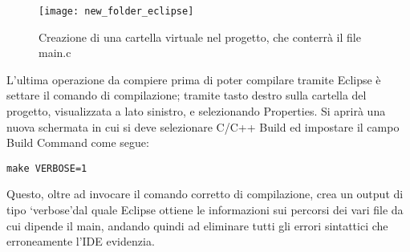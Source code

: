 \begin{figure}[H]
\texttt{[image: new\_folder\_eclipse]}
\centering
\caption{Creazione di una cartella virtuale nel progetto, che conterrà il file main.c}
\label{makefile_proj}
\end{figure}

L'ultima operazione da compiere prima di poter compilare tramite Eclipse è settare il comando di compilazione; tramite tasto destro sulla cartella del progetto, visualizzata a lato sinistro, e selezionando Properties. Si aprirà una nuova schermata in cui si deve selezionare C/C++ Build ed impostare il campo Build Command come segue: 

\begin{verbatim}
make VERBOSE=1
\end{verbatim}
Questo, oltre ad invocare il comando corretto di compilazione, crea un output di tipo \lq verbose\rq dal quale Eclipse ottiene le informazioni sui percorsi dei vari file da cui dipende il main, andando quindi ad eliminare tutti gli errori sintattici che erroneamente l'IDE evidenzia.